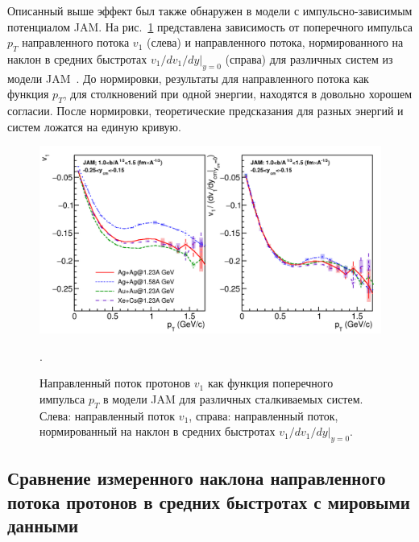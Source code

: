 Описанный выше эффект был также обнаружен в модели с импульсно-зависимым потенциалом JAM.
На рис.~\ref{fig:v1_model_pT_scaling} представлена зависимость от поперечного импульса $p_T$ направленного потока $v_1$ (слева) и направленного потока, нормированного на наклон в средних быстротах $v_1/dv_1/dy|_{y=0}$ (справа) для различных систем из модели JAM~\cite{Mamaev:2023yhz}.
До нормировки, результаты для направленного потока как функция $p_T$, для столкновений при одной энергии, находятся в довольно хорошем согласии.
После нормировки, теоретические предсказания для разных энергий и систем ложатся на единую кривую. 
\begin{figure}[ht]
\begin{center}
\includegraphics[width=0.9\linewidth]{images/v1_hades_model_pT_scaling.png}
\caption{ 
    Направленный поток протонов $v_1$ как функция поперечного импульса $p_T$ в модели JAM для различных сталкиваемых систем. Слева: направленный поток $v_1$, справа: направленный поток, нормированный на наклон в средних быстротах $v_1/dv_1/dy|_{y=0}$.
}.
\label{fig:v1_model_pT_scaling}
\end{center}
\end{figure}

\subsection{Сравнение измеренного наклона направленного потока протонов в средних быстротах с мировыми данными}


